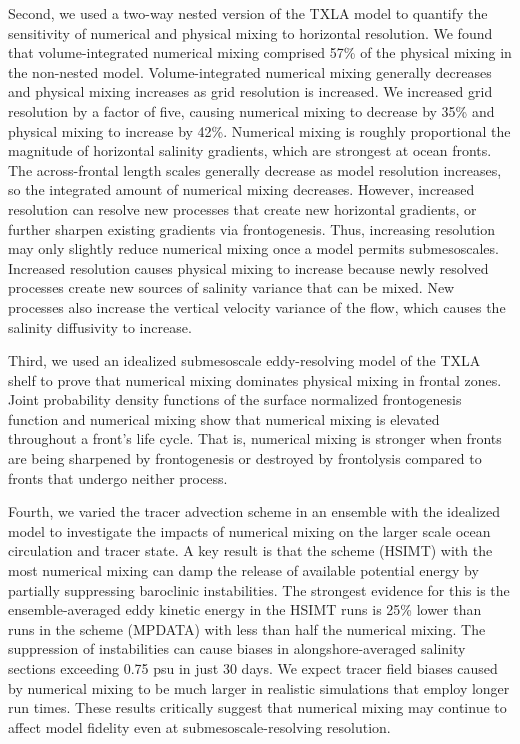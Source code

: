 Second, we used a two-way nested version of the TXLA model to quantify the sensitivity of numerical and physical mixing to horizontal resolution. We found that volume-integrated numerical mixing comprised 57\% of the physical mixing in the non-nested model. Volume-integrated numerical mixing generally decreases and physical mixing increases as grid resolution is increased. We increased grid resolution by a factor of five, causing numerical mixing to decrease by 35\% and physical mixing to increase by 42\%. Numerical mixing is roughly proportional the magnitude of horizontal salinity gradients, which are strongest at ocean fronts. The across-frontal length scales generally decrease as model resolution increases, so the integrated amount of numerical mixing decreases. However, increased resolution can resolve new processes that create new horizontal gradients, or further sharpen existing gradients via frontogenesis. Thus, increasing resolution may only slightly reduce numerical mixing once a model permits submesoscales. Increased resolution causes physical mixing to increase because newly resolved processes create new sources of salinity variance that can be mixed. New processes also increase the vertical velocity variance of the flow, which causes the salinity diffusivity to increase. 

Third, we used an idealized submesoscale eddy-resolving model of the TXLA shelf to prove that numerical mixing dominates physical mixing in frontal zones. Joint probability density functions of the surface normalized frontogenesis function and numerical mixing show that numerical mixing is elevated throughout a front's life cycle. That is, numerical mixing is stronger when fronts are being sharpened by frontogenesis or destroyed by frontolysis compared to fronts that undergo neither process.

Fourth, we varied the tracer advection scheme in an ensemble with the idealized model to investigate the impacts of numerical mixing on the larger scale ocean circulation and tracer state. A key result is that the scheme (HSIMT) with the most numerical mixing can damp the release of available potential energy by partially suppressing baroclinic instabilities. The strongest evidence for this is the ensemble-averaged eddy kinetic energy in the HSIMT runs is 25\% lower than runs in the scheme (MPDATA) with less than half the numerical mixing. The suppression of instabilities can cause biases in alongshore-averaged salinity sections exceeding 0.75 psu in just 30 days. We expect tracer field biases caused by numerical mixing to be much larger in realistic simulations that employ longer run times. These results critically suggest that numerical mixing may continue to affect model fidelity even at submesoscale-resolving resolution. 

